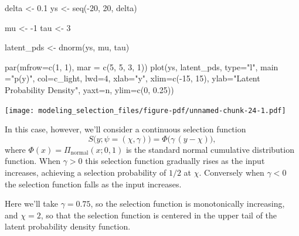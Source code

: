 \documentclass[
  letterpaper,
  DIV=11,
  numbers=noendperiod]{scrartcl}
\newenvironment{Shaded}{\begin{snugshade}}{\end{snugshade}}
\newcommand{\AttributeTok}[1]{\textcolor[rgb]{0.40,0.45,0.13}{#1}}
\newcommand{\DecValTok}[1]{\textcolor[rgb]{0.68,0.00,0.00}{#1}}
\newcommand{\FloatTok}[1]{\textcolor[rgb]{0.68,0.00,0.00}{#1}}
\newcommand{\FunctionTok}[1]{\textcolor[rgb]{0.28,0.35,0.67}{#1}}
\newcommand{\NormalTok}[1]{\textcolor[rgb]{0.00,0.23,0.31}{#1}}
\newcommand{\OtherTok}[1]{\textcolor[rgb]{0.00,0.23,0.31}{#1}}
\newcommand{\SpecialCharTok}[1]{\textcolor[rgb]{0.37,0.37,0.37}{#1}}
\newcommand{\StringTok}[1]{\textcolor[rgb]{0.13,0.47,0.30}{#1}}
\begin{document}
\begin{Shaded}
\begin{Highlighting}[]
\NormalTok{delta }\OtherTok{\textless{}{-}} \FloatTok{0.1}
\NormalTok{ys }\OtherTok{\textless{}{-}} \FunctionTok{seq}\NormalTok{(}\SpecialCharTok{{-}}\DecValTok{20}\NormalTok{, }\DecValTok{20}\NormalTok{, delta)}

\NormalTok{mu }\OtherTok{\textless{}{-}} \SpecialCharTok{{-}}\DecValTok{1}
\NormalTok{tau }\OtherTok{\textless{}{-}} \DecValTok{3}

\NormalTok{latent\_pds }\OtherTok{\textless{}{-}} \FunctionTok{dnorm}\NormalTok{(ys, mu, tau)}

\FunctionTok{par}\NormalTok{(}\AttributeTok{mfrow=}\FunctionTok{c}\NormalTok{(}\DecValTok{1}\NormalTok{, }\DecValTok{1}\NormalTok{), }\AttributeTok{mar =} \FunctionTok{c}\NormalTok{(}\DecValTok{5}\NormalTok{, }\DecValTok{5}\NormalTok{, }\DecValTok{3}\NormalTok{, }\DecValTok{1}\NormalTok{))}
\FunctionTok{plot}\NormalTok{(ys, latent\_pds, }\AttributeTok{type=}\StringTok{"l"}\NormalTok{, }\AttributeTok{main =}\StringTok{"p(y)"}\NormalTok{, }\AttributeTok{col=}\NormalTok{c\_light, }\AttributeTok{lwd=}\DecValTok{4}\NormalTok{,}
     \AttributeTok{xlab=}\StringTok{"y"}\NormalTok{, }\AttributeTok{xlim=}\FunctionTok{c}\NormalTok{(}\SpecialCharTok{{-}}\DecValTok{15}\NormalTok{, }\DecValTok{15}\NormalTok{),}
     \AttributeTok{ylab=}\StringTok{"Latent Probability Density"}\NormalTok{, }\AttributeTok{yaxt=}\StringTok{\textquotesingle{}n\textquotesingle{}}\NormalTok{, }\AttributeTok{ylim=}\FunctionTok{c}\NormalTok{(}\DecValTok{0}\NormalTok{, }\FloatTok{0.25}\NormalTok{))}
\end{Highlighting}
\end{Shaded}

\texttt{[image: modeling\_selection\_files/figure-pdf/unnamed-chunk-24-1.pdf]}

In this case, however, we'll consider a continuous selection function \[
S \big( y; \psi = (\chi, \gamma) \big) = \Phi \big( \gamma \, (y - \chi) \big),
\] where \(\Phi(x) = \Pi_{\text{normal}}(x; 0, 1)\) is the standard
normal cumulative distribution function. When \(\gamma > 0\) this
selection function gradually rises as the input increases, achieving a
selection probability of \(1/2\) at \(\chi\). Conversely when
\(\gamma < 0\) the selection function falls as the input increases.

Here we'll take \(\gamma = 0.75\), so the selection function is
monotonically increasing, and \(\chi = 2\), so that the selection
function is centered in the upper tail of the latent probability density
function.
\end{document}
